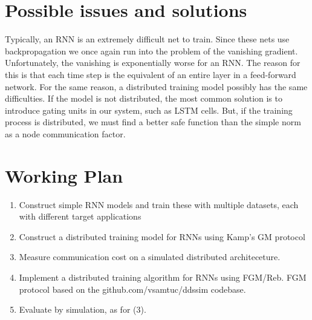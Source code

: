 \documentclass{article}
\begin{document}
    \section*{Possible issues and solutions}
    Typically, an RNN is an extremely difficult net to train. Since these nets use backpropagation we once again run into the problem of the vanishing gradient. Unfortunately, the vanishing is exponentially worse for an RNN. The reason for this is that each time step is the equivalent of an entire layer in a feed-forward network. For the same reason, a distributed training model possibly has the same difficulties. If the model is not distributed, the most common solution is to introduce gating units in our system, such as LSTM cells. But, if the training process is distributed, we must find a better safe function than the simple norm as a node communication factor.

    \section*{Working Plan}
    \begin{enumerate}[label=\arabic*)]
        \item Construct simple RNN models and train these with multiple datasets, each with different target applications
        \item Construct a distributed training model for RNNs using Kamp's GM protocol
        \item Measure communication cost on a simulated distributed architeceture.
        \item Implement a distributed training algorithm for RNNs using FGM/Reb. FGM protocol based on the github.com/vsamtuc/ddssim codebase.
        \item Evaluate by simulation, as for (3).
    \end{enumerate}

\end{document}
